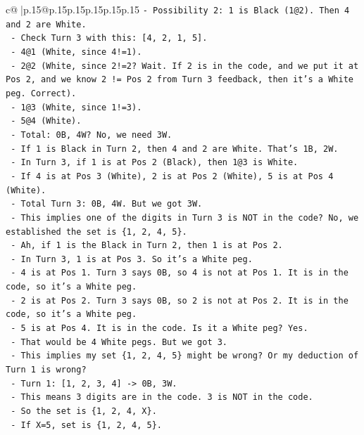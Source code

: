 \documentclass{article}
\begin{document}
{\begin{supertabular}{c@{$\;$}|p{.15\linewidth}@{}p{.15\linewidth}p{.15\linewidth}p{.15\linewidth}p{.15\linewidth}p{.15\linewidth}}
{{{\texttt{{-} Possibility 2: 1 is Black (1@2). Then 4 and 2 are White.} \\
\texttt{  {-} Check Turn 3 with this: {[}4, 2, 1, 5{]}.} \\
\texttt{  {-} 4@1 (White, since 4!=1).} \\
\texttt{  {-} 2@2 (White, since 2!=2? Wait. If 2 is in the code, and we put it at Pos 2, and we know 2 != Pos 2 from Turn 3 feedback, then it's a White peg. Correct).} \\
\texttt{  {-} 1@3 (White, since 1!=3).} \\
\texttt{  {-} 5@4 (White).} \\
\texttt{  {-} Total: 0B, 4W? No, we need 3W.} \\
\texttt{  {-} If 1 is Black in Turn 2, then 4 and 2 are White. That's 1B, 2W.} \\
\texttt{  {-} In Turn 3, if 1 is at Pos 2 (Black), then 1@3 is White.} \\
\texttt{  {-} If 4 is at Pos 3 (White), 2 is at Pos 2 (White), 5 is at Pos 4 (White).} \\
\texttt{  {-} Total Turn 3: 0B, 4W. But we got 3W.} \\
\texttt{  {-} This implies one of the digits in Turn 3 is NOT in the code? No, we established the set is \{1, 2, 4, 5\}.} \\
\texttt{  {-} Ah, if 1 is the Black in Turn 2, then 1 is at Pos 2.} \\
\texttt{  {-} In Turn 3, 1 is at Pos 3. So it's a White peg.} \\
\texttt{  {-} 4 is at Pos 1. Turn 3 says 0B, so 4 is not at Pos 1. It is in the code, so it's a White peg.} \\
\texttt{  {-} 2 is at Pos 2. Turn 3 says 0B, so 2 is not at Pos 2. It is in the code, so it's a White peg.} \\
\texttt{  {-} 5 is at Pos 4. It is in the code. Is it a White peg? Yes.} \\
\texttt{  {-} That would be 4 White pegs. But we got 3.} \\
\texttt{  {-} This implies my set \{1, 2, 4, 5\} might be wrong? Or my deduction of Turn 1 is wrong?} \\
\texttt{  {-} Turn 1: {[}1, 2, 3, 4{]} {-}> 0B, 3W.} \\
\texttt{    {-} This means 3 digits are in the code. 3 is NOT in the code.} \\
\texttt{    {-} So the set is \{1, 2, 4, X\}.} \\
\texttt{    {-} If X=5, set is \{1, 2, 4, 5\}.} \\
}}}
\end{supertabular}}
\end{document}
